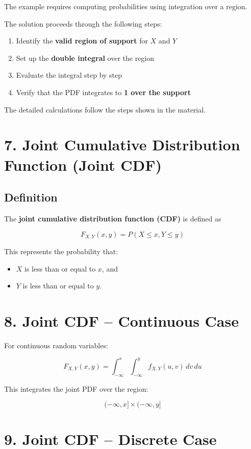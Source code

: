 \documentclass{article}
\begin{document}
The example requires computing probabilities using integration over a region.

The solution proceeds through the following steps:

\begin{enumerate}
\item Identify the \textbf{valid region of support} for $X$ and $Y$
\item Set up the \textbf{double integral} over the region
\item Evaluate the integral step by step
\item Verify that the PDF integrates to \textbf{1 over the support}
\end{enumerate}

The detailed calculations follow the steps shown in the material.

\section*{7. Joint Cumulative Distribution Function (Joint CDF)}

\subsection*{Definition}

The \textbf{joint cumulative distribution function (CDF)} is defined as

\[
F_{X,Y}(x,y) = P(X \le x, Y \le y)
\]

This represents the probability that:

\begin{itemize}
\item $X$ is less than or equal to $x$, and
\item $Y$ is less than or equal to $y$.
\end{itemize}

\section*{8. Joint CDF -- Continuous Case}

For continuous random variables:

\[
F_{X,Y}(x,y)
=
\int_{-\infty}^{x}
\int_{-\infty}^{y}
f_{X,Y}(u,v)\, dv\, du
\]

This integrates the joint PDF over the region:

\[
(-\infty, x] \times (-\infty, y]
\]

\section*{9. Joint CDF -- Discrete Case}
\end{document}
